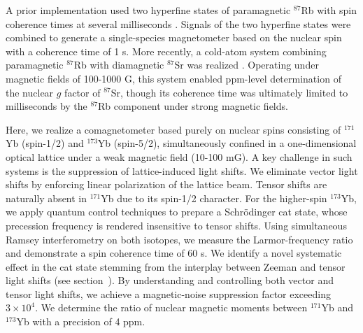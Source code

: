 \documentclass[pdflatex,sn-nature,centre]{sn-jnl}%
\begin{document}
A prior implementation used two hyperfine states of paramagnetic $^{87}$Rb  with spin coherence times at several milliseconds \cite{Pau2020BECComag}. Signals of the two hyperfine states were combined to generate a single-species magnetometer based on the nuclear spin with a coherence time of 1 s. More recently, a cold-atom system combining paramagnetic $^{87}$Rb with diamagnetic $^{87}$Sr was realized \cite{Thekkeppatt2025ComaggFactor}. Operating under magnetic fields of 100-1000 G, this system enabled ppm-level determination of the nuclear $\mathit g$ factor of $^{87}$Sr, though its coherence time was ultimately limited to milliseconds by the $^{87}$Rb component under strong magnetic fields.


Here, we realize a comagnetometer based purely on nuclear spins consisting of $^{171}$Yb (spin-1/2) and $^{173}$Yb (spin-5/2), simultaneously confined in a one-dimensional optical lattice under a weak magnetic field (10-100 mG). A key challenge in such systems is the suppression of lattice-induced light shifts. We eliminate vector light shifts by enforcing linear polarization of the lattice beam. Tensor shifts are naturally absent in $^{171}$Yb due to its spin-1/2 character. For the higher-spin $^{173}$Yb, we apply quantum control techniques to prepare a Schr\"{o}dinger cat state, whose precession frequency is rendered insensitive to tensor shifts. Using simultaneous Ramsey interferometry on both isotopes, we measure the Larmor-frequency ratio and demonstrate a spin coherence time of 60 s. We identify a novel systematic effect in the cat state stemming from the interplay between Zeeman and tensor light shifts (see section~). By understanding and controlling both vector and tensor light shifts, we achieve a magnetic-noise suppression factor exceeding $3\times10^4$. We determine the ratio of nuclear magnetic moments between $^{171}$Yb and $^{173}$Yb with a precision of 4 ppm.
\end{document}
